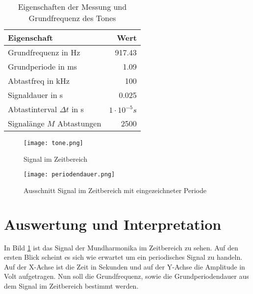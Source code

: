 \begin{table}[H]
\centering
\begin{tabular}{l|r}
Eigenschaft & Wert \\ \hline
Grundfrequenz in Hz & 917.43\\
Grundperiode in ms & 1.09\\
Abtastfreq in kHz & 100\\
Signaldauer in s & 0.025\\
Abtastinterval $\Delta t$ in s & $1 \cdot 10^{-5}s$\\
Signalänge $M$ Abtastungen & 2500\\
\end{tabular}
\caption{Eigenschaften der Messung und Grundfrequenz des Tones}
\label{tab:Eigenschaften}
\end{table}

\begin{figure}[H]
\centering
\texttt{[image: tone.png]}
\caption{Signal im Zeitbereich}
\label{img:SIGNALZEITBEREICH}
\end{figure}

\begin{figure}[H]
\centering
\texttt{[image: periodendauer.png]}
\caption{Ausschnitt Signal im Zeitbereich mit eingezeichneter Periode}
\label{img:SIGNALPERIODE}
\end{figure}

\section{Auswertung und Interpretation}
\label{chap:VERSUCH_1_AUSWERTUNG}
In Bild \ref{img:SIGNALZEITBEREICH} ist das Signal der Mundharmonika im Zeitbereich zu sehen. Auf den ersten Blick scheint es sich wie erwartet um ein periodisches Signal zu handeln. Auf der X-Achse ist die Zeit in Sekunden und auf der Y-Achse die Amplitude in Volt aufgetragen. Nun soll die Grundfrequenz, sowie die Grundperiodendauer aus dem Signal im Zeitbereich bestimmt werden. 
